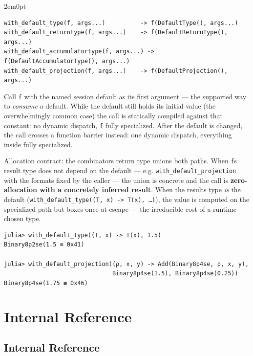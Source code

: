 \begin{adjustwidth}{2em}{0pt}


\begin{verbatim}
with_default_type(f, args...)          -> f(DefaultType(), args...)
with_default_returntype(f, args...)    -> f(DefaultReturnType(), args...)
with_default_accumulatortype(f, args...) -> f(DefaultAccumulatorType(), args...)
with_default_projection(f, args...)    -> f(DefaultProjection(), args...)
\end{verbatim}

Call \texttt{f} with the named session default as its first argument — the supported way to \emph{consume} a default. While the default still holds its initial value (the overwhelmingly common case) the call is statically compiled against that constant: no dynamic dispatch, \texttt{f} fully specialized. After the default is changed, the call crosses a function barrier instead: one dynamic dispatch, everything inside fully specialized.

Allocation contract: the combinator{\textquotesingle}s return type unions both paths. When \texttt{f}{\textquotesingle}s result type does not depend on the default — e.g. \texttt{with\_default\_projection} with the formats fixed by the caller — the union is concrete and the call is \textbf{zero-allocation with a concretely inferred result}. When the result{\textquotesingle}s type \emph{is} the default (\texttt{with\_default\_type((T, x) -> T(x), …)}), the value is computed on the specialized path but boxes once at escape — the irreducible cost of a runtime-chosen type.


\begin{verbatim}
julia> with_default_type((T, x) -> T(x), 1.5)
Binary8p2se(1.5 ≡ 0x41)

julia> with_default_projection((ρ, x, y) -> Add(Binary8p4se, ρ, x, y),
                               Binary8p4se(1.5), Binary8p4se(0.25))
Binary8p4se(1.75 ≡ 0x46)
\end{verbatim}



\end{adjustwidth}

\part{Internal Reference}


\chapter{Internal Reference}



